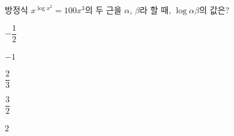 방정식 $x^{\log x^2}=100x^3$의 두 근을 $\alpha$, $\beta$라 할 때, $\log \alpha\beta$의 값은? 
\begin{choices32}{\rule[-3ex]{0pt}{8ex}$-\dfrac{1}{2}$}{\rule[-3ex]{0pt}{8ex}$-1$}{\rule[-3ex]{0pt}{8ex}$\dfrac{2}{3}$}{\rule[-3ex]{0pt}{8ex}$\dfrac{3}{2}$}{\rule[-3ex]{0pt}{8ex}$2$}\end{choices32}
